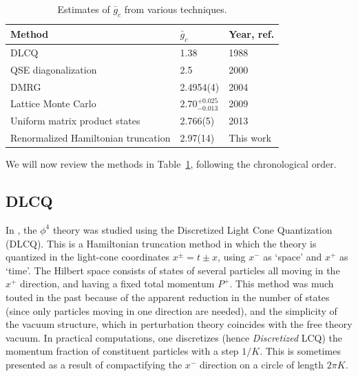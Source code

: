 \documentclass[11pt]{article}
\numberwithin{equation}{section}
\begin{document}
\begin{table}[h!]
\begin{center}
\begin{tabular}{l|l|l}
Method & $\bar{g}_c$  & Year, ref. \\ \hline
DLCQ &  1.38 & 1988 \cite{Harindranath:1988zt} \\ %
QSE diagonalization &  2.5 & 2000 \cite{Lee:2000ac} \\ %
DMRG & 2.4954(4) & 2004 \cite{Sugihara:2004qr} \\ %
Lattice Monte Carlo &  $2.70^{+0.025}_{-0.013}$ & 2009 \cite{Schaich:2009jk} \\ %
Uniform matrix product states  &  2.766(5) & 2013 \cite{Milsted:2013rxa}\\ %
Renormalized Hamiltonian truncation &  2.97(14) & This work   \\ \hline
\end{tabular}
\caption{Estimates of $\bar g_c$ from various techniques.}
\label{table:gc}
\end{center}
\end{table}

We will now review the methods in Table~\ref{table:gc}, following the chronological order.
\subsection{DLCQ}
\label{sec:DLCQ}
In \cite{Harindranath:1987db,Harindranath:1988zt}, the $\phi^4$ theory was studied using the Discretized Light Cone Quantization (DLCQ). This is a Hamiltonian truncation method in which the theory is quantized in the light-cone coordinates $x^\pm=t\pm x$, using $x^-$ as `space' and $x^+$ as `time'. The Hilbert space consists of states of several particles all moving in the $x^+$ direction, and having a fixed total momentum $P^+$. This method was much touted in the past because of the apparent reduction in the number of states (since only particles moving in one direction are needed), and the simplicity of the vacuum structure, which in perturbation theory coincides with the free theory vacuum. In practical computations, one discretizes (hence \emph{Discretized} LCQ) the momentum fraction of constituent particles with a step $1/K$. This is sometimes presented as a result of compactifying the $x^-$ direction on a circle of length $2\pi K$.
\end{document}
